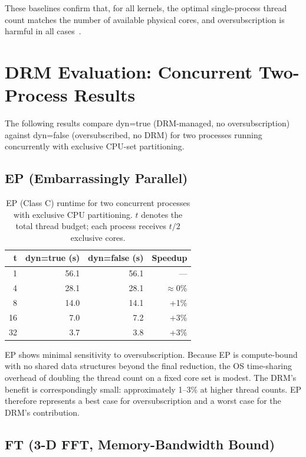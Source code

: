 These baselines confirm that, for all kernels, the optimal single-process thread count matches the number of available physical cores, and oversubscription is harmful in all cases~\parencite{iancu2010oversubscription}.

\section{DRM Evaluation: Concurrent Two-Process Results}\label{sec:drm_results}

The following results compare dyn=true (DRM-managed, no oversubscription) against dyn=false (oversubscribed, no DRM) for two processes running concurrently with exclusive CPU-set partitioning.

\subsection{EP (Embarrassingly Parallel)}

\begin{table}[htpb]
  \caption[EP benchmark results]{EP (Class C) runtime for two concurrent processes with exclusive CPU partitioning. $t$ denotes the total thread budget; each process receives $t/2$ exclusive cores.}\label{tab:ep_results}
  \centering
  \begin{tabular}{r r r r}
    \toprule
    \textbf{t} & \textbf{dyn=true (s)} & \textbf{dyn=false (s)} & \textbf{Speedup} \\
    \midrule
    1  & 56.1 & 56.1 & ---   \\
    4  & 28.1 & 28.1 & $\approx$0\% \\
    8  & 14.0 & 14.1 & +1\%  \\
    16 & 7.0  & 7.2  & +3\%  \\
    32 & 3.7  & 3.8  & +3\%  \\
    \bottomrule
  \end{tabular}
\end{table}

EP shows minimal sensitivity to oversubscription. Because EP is compute-bound with no shared data structures beyond the final reduction, the OS time-sharing overhead of doubling the thread count on a fixed core set is modest. The DRM's benefit is correspondingly small: approximately 1--3\% at higher thread counts. EP therefore represents a best case for oversubscription and a worst case for the DRM's contribution.

\subsection{FT (3-D FFT, Memory-Bandwidth Bound)}

